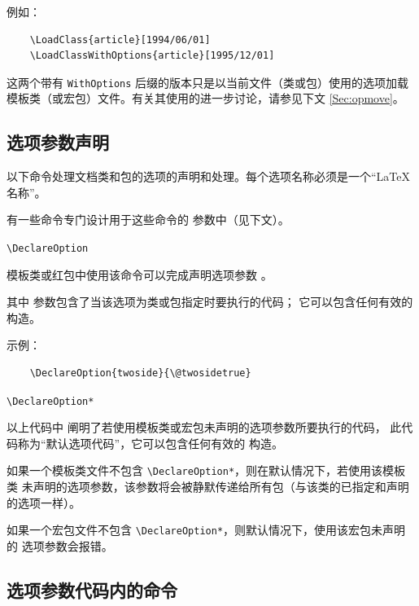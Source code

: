 \documentclass{ltxguide}[1995/11/28]
\begin{document}
例如：
\begin{verbatim}
	\LoadClass{article}[1994/06/01]
	\LoadClassWithOptions{article}[1995/12/01]
\end{verbatim}

这两个带有 \verb|WithOptions| 后缀的版本只是以当前文件（类或包）使用的选项加载
模板类（或宏包）文件。有关其使用的进一步讨论，请参见下文 \ref{Sec:opmove}。

\subsection{选项参数声明}
\label{Sec:commands.options.dec}

以下命令处理文档类和包的选项的声明和处理。每个选项名称必须是一个“\LaTeX{}名称”。

有一些命令专门设计用于这些命令的  参数中（见下文）。

\begin{decl}
	\verb|\DeclareOption|  
\end{decl}
模板类或红包中使用该命令可以完成声明选项参数  。

其中  参数包含了当该选项为类或包指定时要执行的代码；
它可以包含任何有效的 \LaTeXe{} 构造。

示例：
\begin{verbatim}
	\DeclareOption{twoside}{\@twosidetrue}
\end{verbatim}

\begin{decl}
	\verb|\DeclareOption*| 
\end{decl}
以上代码中  阐明了若使用模板类或宏包未声明的选项参数所要执行的代码，
此代码称为“默认选项代码”，它可以包含任何有效的 \LaTeXe{} 构造。

如果一个模板类文件不包含 \verb|\DeclareOption*|，则在默认情况下，若使用该模板类
未声明的选项参数，该参数将会被静默传递给所有包（与该类的已指定和声明的选项一样）。

如果一个宏包文件不包含 \verb|\DeclareOption*|，则默认情况下，使用该宏包未声明的
选项参数会报错。

\subsection{选项参数代码内的命令}
\label{Sec:within.code}
\end{document}
